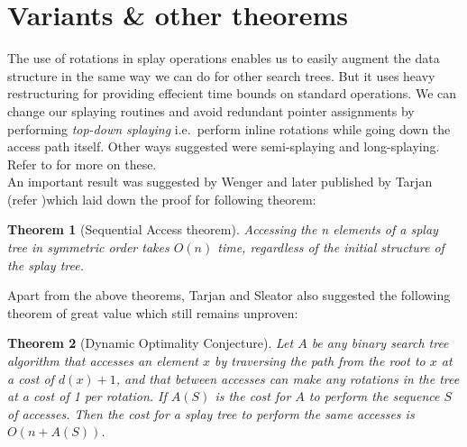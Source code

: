 \documentclass{article}
\newtheorem{thm}{Theorem}
\begin{document}
\section{Variants \& other theorems}
The use of rotations in splay operations enables us to easily augment the data structure in the same way we can do for other search trees. But it uses heavy restructuring for providing effecient time bounds on standard operations. We can change our splaying routines and avoid redundant pointer assignments by performing \emph{top-down splaying} i.e.~perform inline rotations while going down the access path itself. Other ways suggested were semi-splaying and long-splaying. Refer to \cite{splay} for more on these.\\
An important result	was suggested by Wenger and later published by Tarjan (refer \cite{seq})which laid down the proof for following theorem:
\begin{thm}[Sequential Access theorem]
\label{thm:seq}
Accessing the n elements of a splay tree in symmetric order takes $O(n)$ time, regardless of the initial structure of the splay tree.\
\end{thm}
Apart from the above theorems, Tarjan and Sleator also suggested the following theorem of great value which still remains unproven:
\begin{thm}[Dynamic Optimality Conjecture]
\label{thm:doc}
Let $A$ be any binary search tree algorithm that accesses an element $x$ by traversing the path from the root to $x$ at a cost of $d(x)+1$, and that between accesses can make any rotations in the tree at a cost of 1 per rotation. If $A(S)$ is the cost for $A$ to perform the sequence $S$ of accesses. Then the cost for a splay tree to perform the same accesses is $O(n + A(S))$.
\end{thm}
\end{document}

